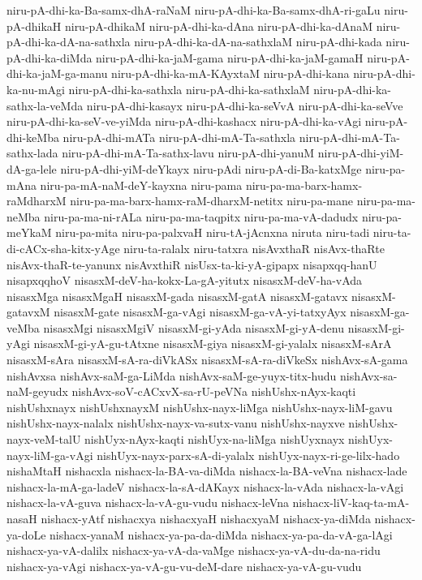 {niru-pA-dhi-ka-Ba-samx-dhA-raNaM
niru-pA-dhi-ka-Ba-samx-dhA-ri-gaLu
niru-pA-dhikaH
niru-pA-dhikaM
niru-pA-dhi-ka-dAna
niru-pA-dhi-ka-dAnaM
niru-pA-dhi-ka-dA-na-sathxla
niru-pA-dhi-ka-dA-na-sathxlaM
niru-pA-dhi-kada
niru-pA-dhi-ka-diMda
niru-pA-dhi-ka-jaM-gama
niru-pA-dhi-ka-jaM-gamaH
niru-pA-dhi-ka-jaM-ga-manu
niru-pA-dhi-ka-mA-KAyxtaM
niru-pA-dhi-kana
niru-pA-dhi-ka-nu-mAgi
niru-pA-dhi-ka-sathxla
niru-pA-dhi-ka-sathxlaM
niru-pA-dhi-ka-sathx-la-veMda
niru-pA-dhi-kasayx
niru-pA-dhi-ka-seVvA
niru-pA-dhi-ka-seVve
niru-pA-dhi-ka-seV-ve-yiMda
niru-pA-dhi-kashacx
niru-pA-dhi-ka-vAgi
niru-pA-dhi-keMba
niru-pA-dhi-mATa
niru-pA-dhi-mA-Ta-sathxla
niru-pA-dhi-mA-Ta-sathx-lada
niru-pA-dhi-mA-Ta-sathx-lavu
niru-pA-dhi-yanuM
niru-pA-dhi-yiM-dA-ga-lele
niru-pA-dhi-yiM-deYkayx
niru-pAdi
niru-pA-di-Ba-katxMge
niru-pa-mAna
niru-pa-mA-naM-deY-kayxna
niru-pama
niru-pa-ma-barx-hamx-raMdharxM
niru-pa-ma-barx-hamx-raM-dharxM-netitx
niru-pa-mane
niru-pa-ma-neMba
niru-pa-ma-ni-rALa
niru-pa-ma-taqpitx
niru-pa-ma-vA-dadudx
niru-pa-meYkaM
niru-pa-mita
niru-pa-palxvaH
niru-tA-jAcnxna
niruta
niru-tadi
niru-ta-di-cACx-sha-kitx-yAge
niru-ta-ralalx
niru-tatxra
nisAvxthaR
nisAvx-thaRte
nisAvx-thaR-te-yanunx
nisAvxthiR
nisUsx-ta-ki-yA-gipapx
nisapxqq-hanU
nisapxqqhoV
nisasxM-deV-ha-kokx-La-gA-yitutx
nisasxM-deV-ha-vAda
nisasxMga
nisasxMgaH
nisasxM-gada
nisasxM-gatA
nisasxM-gatavx
nisasxM-gatavxM
nisasxM-gate
nisasxM-ga-vAgi
nisasxM-ga-vA-yi-tatxyAyx
nisasxM-ga-veMba
nisasxMgi
nisasxMgiV
nisasxM-gi-yAda
nisasxM-gi-yA-denu
nisasxM-gi-yAgi
nisasxM-gi-yA-gu-tAtxne
nisasxM-giya
nisasxM-gi-yalalx
nisasxM-sArA
nisasxM-sAra
nisasxM-sA-ra-diVkASx
nisasxM-sA-ra-diVkeSx
nishAvx-sA-gama
nishAvxsa
nishAvx-saM-ga-LiMda
nishAvx-saM-ge-yuyx-titx-hudu
nishAvx-sa-naM-geyudx
nishAvx-soV-cACxvX-sa-rU-peVNa
nishUshx-nAyx-kaqti
nishUshxnayx
nishUshxnayxM
nishUshx-nayx-liMga
nishUshx-nayx-liM-gavu
nishUshx-nayx-nalalx
nishUshx-nayx-va-sutx-vanu
nishUshx-nayxve
nishUshx-nayx-veM-talU
nishUyx-nAyx-kaqti
nishUyx-na-liMga
nishUyxnayx
nishUyx-nayx-liM-ga-vAgi
nishUyx-nayx-parx-sA-di-yalalx
nishUyx-nayx-ri-ge-lilx-hado
nishaMtaH
nishacxla
nishacx-la-BA-va-diMda
nishacx-la-BA-veVna
nishacx-lade
nishacx-la-mA-ga-ladeV
nishacx-la-sA-dAKayx
nishacx-la-vAda
nishacx-la-vAgi
nishacx-la-vA-guva
nishacx-la-vA-gu-vudu
nishacx-leVna
nishacx-liV-kaq-ta-mA-nasaH
nishacx-yAtf
nishacxya
nishacxyaH
nishacxyaM
nishacx-ya-diMda
nishacx-ya-doLe
nishacx-yanaM
nishacx-ya-pa-da-diMda
nishacx-ya-pa-da-vA-ga-lAgi
nishacx-ya-vA-dalilx
nishacx-ya-vA-da-vaMge
nishacx-ya-vA-du-da-na-ridu
nishacx-ya-vAgi
nishacx-ya-vA-gu-vu-deM-dare
nishacx-ya-vA-gu-vudu
}

